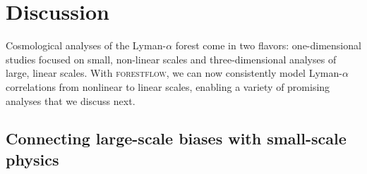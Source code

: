 \documentclass[longauth]{aa}
\newcommand{\lya}{Lyman-$\alpha$\xspace}
\newcommand{\forestflow}{\textsc{forestflow}\xspace}
\begin{document}

\section{Discussion}
\label{sec:discussion}

Cosmological analyses of the \lya forest come in two flavors: one-dimensional studies focused on small, non-linear scales and three-dimensional analyses of large, linear scales. With \forestflow, we can now consistently model \lya correlations from nonlinear to linear scales, enabling a variety of promising analyses that we discuss next.


\subsection{Connecting large-scale biases with small-scale physics}
\label{sec:discussion_large_small}
\end{document}
